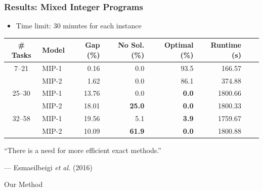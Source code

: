 \documentclass{beamer}
\begin{document}
\begin{frame}
\frametitle{Results: Mixed Integer Programs}
\begin{itemize}
	\item Time limit: 30 minutes for each instance\pause
\end{itemize}
\begin{table}
	\centering
	\begin{tabular}{clrrrrrr}
		\toprule
		\# Tasks & Model & Gap (\%) & No Sol. (\%) & Optimal (\%) & Runtime (s) \\\midrule\midrule
		7--21 & MIP-1 & 0.16 & 0.0 & 93.5 & 166.57 \\
		 & MIP-2 & 1.62 & 0.0 & 86.1 & 374.88 \\\midrule
		25--30 & MIP-1 & 13.76 & 0.0 & {\bf 0.0} & 1800.66 \\
		 & MIP-2  & 18.01 & {\bf 25.0} & {\bf 0.0} & 1800.33 \\\midrule
		32--58 & MIP-1 & 19.56 & 5.1 & {\bf 3.9} & 1759.67 \\
		 & MIP-2 & 10.09 & {\bf 61.9} & {\bf 0.0} & 1800.88 \\
		\bottomrule
	\end{tabular}\pause
\end{table}

``There is a need for more efficient exact methods.''
\begin{flushright}--- Esmaeilbeigi {\it et al.} (2016)\end{flushright}
\end{frame}


\begin{frame}
\Huge{\centerline{Our Method}}
\end{frame}
\end{document}
